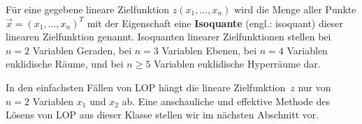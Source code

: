 \medskip
\noindent
F\"ur eine gegebene lineare Zielfunktion $z(x_{1},\ldots,x_{n})$
wird die Menge aller Punkte $\vec{x} = (x_{1},\ldots,x_{n})^{T}$
mit der Eigenschaft
%
\be
{}
\ee
%
eine {\bf Isoquante} (engl.: isoquant) dieser linearen 
Zielfunktion genannt.
Isoquanten linearer Zielfunktionen stellen bei $n=2$ Variablen
Geraden, bei $n=3$ Variablen Ebenen, bei $n=4$ Variablen 
euklidische R\"aume, und bei $n\geq 5$ Variablen euklidische 
Hyperr\"aume dar.

\medskip
\noindent
In den einfachsten F\"allen von LOP h\"angt die lineare
Zielfunktion~$z$ nur von $n=2$ Variablen $x_{1}$ und
$x_{2}$ ab. Eine anschauliche und effektive Methode des L\"osens
von LOP aus dieser Klasse stellen wir im n\"achsten Abschnitt
vor.

